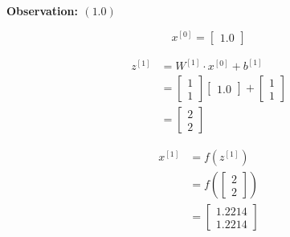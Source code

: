 \documentclass[12pt]{article}
\begin{document}
\begin{enumerate}[leftmargin=\labelsep]
\begin{paracol}{3}
              \switchcolumn

              \begin{center}
                  \textbf{Observation: $(1.0)$}
              \end{center}

              $$
                  x^{[0]} = \begin{bmatrix}
                      1.0
                  \end{bmatrix}
              $$

              $$
                  \begin{aligned}
                      z^{[1]} & = W^{[1]} \cdot x^{[0]} + b^{[1]} \\
                              & = \begin{bmatrix}
                                      1 \\
                                      1
                                  \end{bmatrix}
                      \begin{bmatrix}
                          1.0
                      \end{bmatrix}
                      +
                      \begin{bmatrix}
                          1 \\
                          1
                      \end{bmatrix}                              \\
                              & = \begin{bmatrix}{}
                                      2 \\
                                      2
                                  \end{bmatrix}
                  \end{aligned}
              $$

              $$
                  \begin{aligned}
                      x^{[1]} & = f(z^{[1]})                  \\
                              & = f\left(\begin{bmatrix}{}
                                                 2 \\
                                                 2
                                             \end{bmatrix}\right) \\
                              & = \begin{bmatrix}{}
                                      1.2214 \\
                                      1.2214
                                  \end{bmatrix}
                  \end{aligned}
              $$


\end{paracol}
\end{enumerate}
\end{document}
